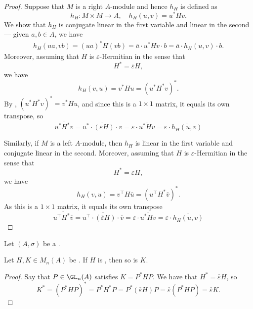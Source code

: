 \begin{proof}
    Suppose that $M$ is a right $A$-module and hence $h_H$ is defined as 
    $$h_H: M \times M \to A, \quad h_H(u,v) = u^* H v.$$
    We show that $h_H$ is conjugate linear in the first variable and linear in the second --- given $a,b \in A$, we have 
    \begin{align*}
        h_H(ua, vb) = (ua)^* H (vb) = \overline{a} \cdot u^* H v \cdot b = \overline{a} \cdot h_H(u,v) \cdot b.
    \end{align*}
    Moreover, assuming that $H$ is $\varepsilon$-Hermitian in the sense that 
    $$H^* = \overline{\varepsilon} H,$$
    we have 
    $$h_H(v,u) = v^* H u = (u^* H^* v)^*.$$
    By , $(u^* H^* v)^* = v^* H u$, and since this is a $1 \times 1$ matrix, it equals its own transpose, so
    $$\overline{u^* H^* v} = \overline{u^* \cdot (\overline{\varepsilon} H) \cdot v}  = \varepsilon \cdot \overline{u^*  H v} = \varepsilon \cdot \overline{h_H(u,v)}$$

    Similarly, if $M$ is a left $A$-module, then $h_H$ is linear in the first variable and conjugate linear in the second. Moreover, assuming that $H$ is $\varepsilon$-Hermitian in the sense that 
    $$H^* = \varepsilon H,$$
    we have 
    $$h_H(v,u) = v^\top H \overline{u} = (u^\top H^* \overline{v})^*.$$
    As this is a $1 \times 1$ matrix, it equals its own transpose 
    $$\overline{u^\top H^* \overline{v}} = \overline{u^\top \cdot (\overline{\varepsilon} H) \cdot \overline{v}}  = \varepsilon \cdot \overline{u^*  H v} = \varepsilon \cdot \overline{h_H(u,v)}$$
\end{proof}


\begin{lemma} \label{lemma:star_conjugate_transpose_congruent_square_matrices_over_a_ring_with_involution_are_varepsilon_hermitian_if_and_only_if_the_other_is}
    Let $(A,\sigma)$ be a .

    Let $H,K \in M_n(A)$ be . If $H$ is , then so is $K$.
\end{lemma}
\begin{proof}
    Say that $P \in \GL_n(A)$ satisfies $K = P^* H P$. We have that $H^* = \overline{\varepsilon} H$, so 
    $$K^* = (P^* H P)^* = P^* H^* P = P^* (\overline{\varepsilon} H) P = \overline{\varepsilon} (P^* H P) = \overline{\varepsilon} K.$$
\end{proof}

